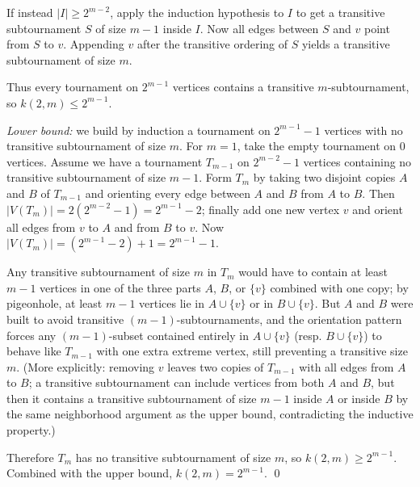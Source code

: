 If instead $|I|\ge 2^{m-2}$, apply the induction hypothesis to $I$ to get a transitive subtournament $S$ of size $m-1$ inside $I$.  Now all edges between $S$ and $v$ point from $S$ to $v$.  Appending $v$ after the transitive ordering of $S$ yields a transitive subtournament of size $m$.

Thus every tournament on $2^{m-1}$ vertices contains a transitive $m$-subtournament, so $k(2,m)\le 2^{m-1}$.

\emph{Lower bound:} we build by induction a tournament on $2^{m-1}-1$ vertices with no transitive subtournament of size $m$.
For $m=1$, take the empty tournament on $0$ vertices.
Assume we have a tournament $T_{m-1}$ on $2^{m-2}-1$ vertices containing no transitive subtournament of size $m-1$.  Form $T_m$ by taking two disjoint copies $A$ and $B$ of $T_{m-1}$ and orienting every edge between $A$ and $B$ from $A$ to $B$.  Then $|V(T_m)|=2(2^{m-2}-1)=2^{m-1}-2$; finally add one new vertex $v$ and orient all edges from $v$ to $A$ and from $B$ to $v$.  Now $|V(T_m)|=(2^{m-1}-2)+1=2^{m-1}-1$.

Any transitive subtournament of size $m$ in $T_m$ would have to contain at least $m-1$ vertices in one of the three parts $A$, $B$, or $\{v\}$ combined with one copy; by pigeonhole, at least $m-1$ vertices lie in $A\cup\{v\}$ or in $B\cup\{v\}$.  But $A$ and $B$ were built to avoid transitive $(m-1)$-subtournaments, and the orientation pattern forces any $(m-1)$-subset contained entirely in $A\cup\{v\}$ (resp. $B\cup\{v\}$) to behave like $T_{m-1}$ with one extra extreme vertex, still preventing a transitive size $m$.  (More explicitly: removing $v$ leaves two copies of $T_{m-1}$ with all edges from $A$ to $B$; a transitive subtournament can include vertices from both $A$ and $B$, but then it contains a transitive subtournament of size $m-1$ inside $A$ or inside $B$ by the same neighborhood argument as the upper bound, contradicting the inductive property.)

Therefore $T_m$ has no transitive subtournament of size $m$, so $k(2,m)\ge 2^{m-1}$.  Combined with the upper bound, $k(2,m)=2^{m-1}$. \qed

